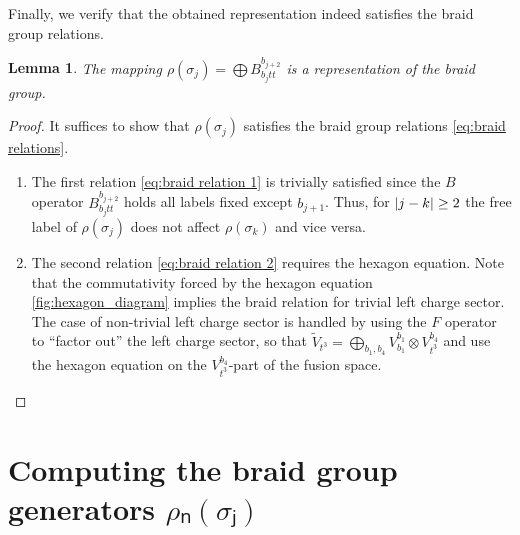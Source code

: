 \documentclass[a4paper,10pt,oneside]{book}
\theoremstyle{plain}
\newtheorem{lemma}[theorem]{Lemma}
\theoremstyle{definition}
\theoremstyle{remark}
\DeclarePairedDelimiter\abs{\lvert}{\rvert}
\begin{document}
Finally, we verify that the obtained representation indeed satisfies the braid group relations.
\begin{lemma}
  The mapping $ρ(σ_j) = \bigoplus B_{b_j t t}^{b_{j+2}}$ is a representation of the braid group.
\end{lemma}
\begin{proof}
  It suffices to show that $ρ(σ_j)$ satisfies the braid group relations \cref{eq:braid relations}.
  \begin{enumerate}
    \item The first relation \cref{eq:braid relation 1} is trivially satisfied since the $B$ operator $B_{b_jtt}^{b_{j+2}}$ holds all labels fixed except $b_{j+1}$. Thus, for $\abs{j-k} \ge 2$ the free label of $ρ(σ_j)$ does not affect $ρ(σ_k)$ and vice versa.
    \item The second relation \cref{eq:braid relation 2} requires the hexagon equation. Note that the commutativity forced by the hexagon equation \cref{fig:hexagon_diagram} implies the braid relation for trivial left charge sector. The case of non-trivial left charge sector is handled by using the $F$ operator to ``factor out'' the left charge sector, so that $\widetilde{V}_{t^3} = \bigoplus_{b_1, b_4} V_{b_1}^{b_{1}} \otimes V_{t^3}^{b_{4}}$ and use the hexagon equation on the $V_{t^3}^{b_{4}}$-part of the fusion space.
  \end{enumerate}
\end{proof}

























\section{Computing the braid group generators \texorpdfstring{$ρₙ(σⱼ)$}{ρₙ(σⱼ)}}\label{sec:general braiding}
\end{document}
